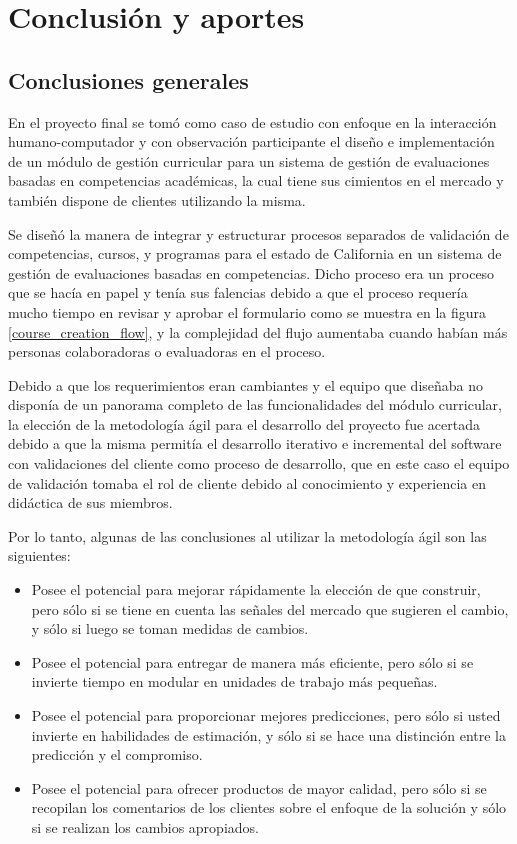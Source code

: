 
\chapter{Conclusión y aportes} \label{capitulo8} 

\section{Conclusiones generales}
En el proyecto final se tomó como caso de estudio con enfoque en la interacción humano-computador y con observación participante el diseño e implementación de un módulo de gestión curricular para un sistema de gestión de evaluaciones basadas en competencias académicas, la cual tiene sus cimientos en el mercado y también dispone de clientes utilizando la misma. 

Se diseñó la manera de integrar y estructurar procesos separados de validación de competencias, cursos, y programas para el estado de California en un sistema de gestión de evaluaciones basadas en competencias. Dicho proceso era un proceso que se hacía en papel y tenía sus falencias debido a que el proceso requería mucho tiempo en revisar y aprobar el formulario como se muestra en la figura \ref{course_creation_flow}, y la complejidad del flujo aumentaba cuando habían más personas colaboradoras o evaluadoras en el proceso.

Debido a que los requerimientos eran cambiantes y el equipo que diseñaba no disponía de un panorama completo de las funcionalidades del módulo curricular, la elección de la metodología ágil para el desarrollo del proyecto fue acertada debido a que la misma permitía el desarrollo iterativo e incremental del software con validaciones del cliente como proceso de desarrollo, que en este caso el equipo de validación tomaba el rol de cliente debido al conocimiento y experiencia en didáctica de sus miembros.

Por lo tanto, algunas de las conclusiones al utilizar la metodología ágil son las siguientes:
\begin{itemize}
	\item Posee el potencial para mejorar rápidamente la elección de que construir, pero sólo si se tiene en cuenta las señales del mercado que sugieren el cambio, y sólo si luego se toman medidas de cambios.
	\item Posee el potencial para entregar de manera más eficiente, pero sólo si se invierte tiempo en modular en unidades de trabajo más pequeñas. 
	\item Posee el potencial para proporcionar mejores predicciones, pero sólo si usted invierte en habilidades de estimación, y sólo si se hace una distinción entre la predicción y el compromiso.
	\item Posee el potencial para ofrecer productos de mayor calidad, pero sólo si se recopilan los comentarios de los clientes sobre el enfoque de la solución y sólo si se realizan los cambios apropiados.
\end{itemize}

